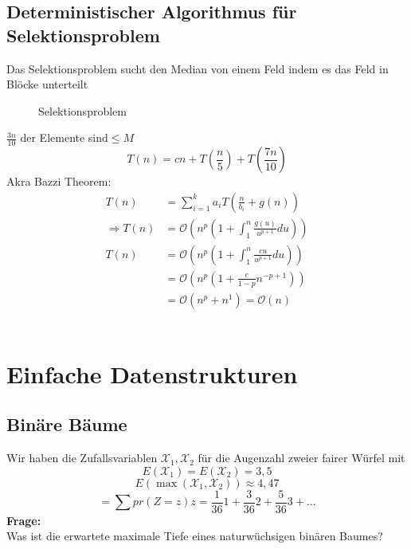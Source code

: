 \documentclass[a4paper,twoside,10pt]{report}
\begin{document}
{\section{Deterministischer Algorithmus für Selektionsproblem}
Das Selektionsproblem sucht den Median von einem Feld indem es das Feld in Blöcke unterteilt
\begin{figure}[H]\center\caption{Selektionsproblem}\end{figure}
$\frac{3n}{10}$ der Elemente sind$\le M$\\
$$T(n)=cn+T\left(\frac{n}{5}\right)+T\left(\frac{7n}{10}\right)$$
Akra Bazzi Theorem:
\begin{align*}
T(n)&=\sum_{i=1}^ka_iT\left(\frac{n}{b_i}+g(n)\right)\\
\Rightarrow T(n)&= \mathcal O\left( n^p\left(1+\int_1^n\frac{g(u)}{u^{p+1}}du\right)\right)\\
T(n)&=\mathcal O\left(n^p\left(1+\int_1^n\frac{cu}{u^{p+1}}du\right)\right)\\
&=\mathcal O\left(n^p\left(1+\frac{c}{1-p}n^{-p+1}\right)\right)\\
&=\mathcal O(n^p+n^1)=\mathcal O(n)
\end{align*}
\\[.5em]




























\chapter{Einfache Datenstrukturen}
\section{Binäre Bäume}
Wir haben die Zufallsvariablen $\mathcal X_1,\mathcal X_2 $ für die Augenzahl zweier fairer Würfel mit 
\[E(\mathcal X_1)=E(\mathcal X_2)=3,5 \]
\[E(\max(\mathcal X_1,\mathcal X_2))\approx4,47 \]
\[=\sum pr(Z=z) z = \frac{1}{36}1+\frac{3}{36}2+\frac{5}{36}3+\hdots \]
\textbf{Frage:}\\
Was ist die erwartete maximale Tiefe eines naturwüchsigen binären Baumes?

}
\end{document}
